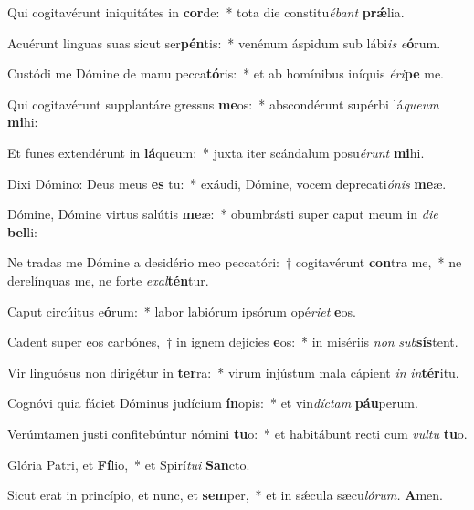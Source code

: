 \item Qui cogitavérunt iniquitátes in \textbf{cor}de:~* tota die constitu\tinyhspace\textit{ébant} \textbf{prǽ}lia.
\item Acuérunt linguas suas sicut ser\textbf{pén}tis:~* venénum áspidum sub lábi\tinyhspace\textit{is} \textit{e}\textbf{ó}rum.
\item Custódi me Dómine de manu pecca\textbf{tó}ris:~* et ab homínibus iníquis \textit{éri}\textbf{pe} me.
\item Qui cogitavérunt supplantáre gressus \textbf{me}os:~* abscondérunt supérbi lá\tinyhspace\textit{queum} \textbf{mi}hi:
\item Et funes extendérunt in \textbf{lá}queum:~* juxta iter scándalum posu\tinyhspace\textit{érunt} \textbf{mi}hi.
\item Dixi Dómino: Deus meus \textbf{es} tu:~* exáudi, Dómine, vocem deprecati\tinyhspace\textit{ónis} \textbf{me}æ.
\item Dómine, Dómine virtus salútis \textbf{me}æ:~* obumbrásti super caput meum in \textit{die} \textbf{bel}li:
\item Ne tradas me Dómine a desidério meo peccatóri:~† cogitavérunt \textbf{con}tra me,~* ne derelínquas me, ne forte \textit{exal}\textbf{tén}tur.
\item Caput circúitus e\textbf{ó}rum:~* labor labiórum i\-psórum opé\textit{riet} \textbf{e}os.
\item Cadent super eos carbónes,~† in ignem dejícies \textbf{e}os:~* in misériis \textit{non} \textit{sub}\textbf{sís}tent.
\item Vir linguósus non dirigétur in \textbf{ter}ra:~* virum injústum mala cápient \textit{in} \textit{in}\textbf{tér}itu.
\item Cognóvi quia fáciet Dóminus judícium \textbf{ín}opis:~* et vin\tinyhspace\textit{díctam} \textbf{páu}perum.
\item Verúmtamen justi confitebúntur nómini \textbf{tu}o:~* et habitábunt recti cum \textit{vultu} \textbf{tu}o.
\item Glória Patri, et \textbf{Fí}lio,~* et Spirí\tinyhspace\textit{tui} \textbf{San}cto.
\item Sicut erat in princípio, et nunc, et \textbf{sem}per,~* et in sǽcula sæcu\tinyhspace\textit{lórum.} \textbf{A}men.